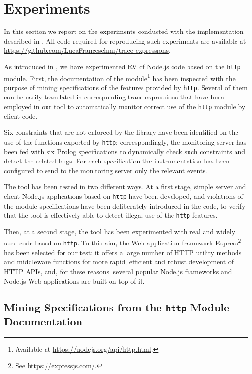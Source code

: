 \section{Experiments}
\label{sec:exps}

In this section we report on the experiments conducted with the implementation described in .
All code required for reproducing such experiments are available
at \url{https://github.com/LucaFranceschini/trace-expressions}. %

As introduced in , we have experimented RV  of Node.js code based on the \lstinline{http} module.
First, the documentation of the module\footnote{Available at \url{https://nodejs.org/api/http.html}.} has been inspected with the purpose of mining specifications of the features provided by \lstinline{http}.
Several of them can be easily translated in corresponding trace expressions
that have been employed in our tool to automatically monitor correct use of the \lstinline{http}
module by client code.

Six constraints that are not enforced by the library have been identified on the use of the functions exported by \lstinline{http};
correspondingly, the monitoring server has been fed with six Prolog specifications to
dynamically check such constraints and detect the related bugs.
For each specification the instrumentation has been configured to send to the monitoring server only
the relevant events.

The tool has been tested in two different ways.
At a first stage, simple server and client Node.js applications based on \lstinline{http} have been developed,
and violations of the module specifications have been deliberately introduced in the code,
to verify that the tool is effectively able to detect illegal use of the \lstinline{http} features.

Then, at a second stage, the tool has been experimented with real and widely used code based on  \lstinline{http}.
To this aim, the Web application framework Express\footnote{See \url{https://expressjs.com/}.} has been
selected for our test: it offers a large number of HTTP utility methods and middleware functions for more rapid, efficient
and robust development of HTTP APIs, and, for these reasons, several popular Node.js frameworks and Node.js Web applications
are built on top of it.

\subsection{Mining Specifications from the \lstinline{http} Module Documentation}\label{sec:spec-minining}

